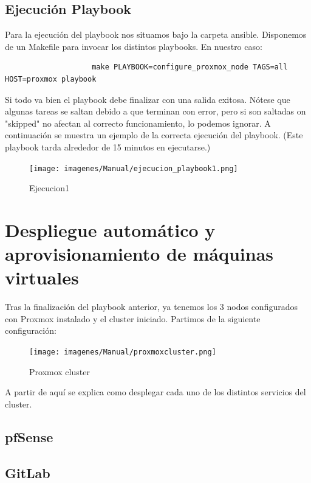 		\subsection{Ejecución Playbook}
			\begin{paragraph}
				Para la ejecución del playbook nos situamos bajo la carpeta ansible. Disponemos de un Makefile para invocar los distintos playbooks. En nuestro caso:
				\lstset{language=bash}
				\begin{lstlisting}
					make PLAYBOOK=configure_proxmox_node TAGS=all HOST=proxmox playbook
				\end{lstlisting}
			\end{paragraph}
		\clearpage
		Si todo va bien el playbook debe finalizar con una salida exitosa. Nótese que algunas tareas se saltan debido a que terminan con error, pero si son saltadas on "skipped" no afectan al correcto funcionamiento, lo podemos ignorar. A continuación se muestra un ejemplo de la correcta ejecución del playbook. (Este playbook tarda alrededor de 15 minutos en ejecutarse.)
		
		\begin{figure}[!hbt]
			\centering
			\texttt{[image: imagenes/Manual/ejecucion\_playbook1.png]}
			\caption[Ejecucion1]{Ejecucion1}
			\label{Ejecucion Configure proxmox nodes}
		\end{figure}
		
	\section{Despliegue automático y aprovisionamiento de máquinas virtuales}
		\begin{paragraph}
			Tras la finalización del playbook anterior, ya tenemos los 3 nodos configurados con Proxmox instalado y el cluster iniciado. Partimos de la siguiente configuración:
			
			\begin{figure}[!hbt]
				\centering
				\texttt{[image: imagenes/Manual/proxmoxcluster.png]}
				\caption[Proxmox cluster]{Proxmox cluster}
				\label{Proxmox_cluster}
			\end{figure}
		
			A partir de aquí se explica como desplegar cada uno de los distintos servicios del cluster. 			
		\end{paragraph}
		\subsection{pfSense}
		\subsection{GitLab}
